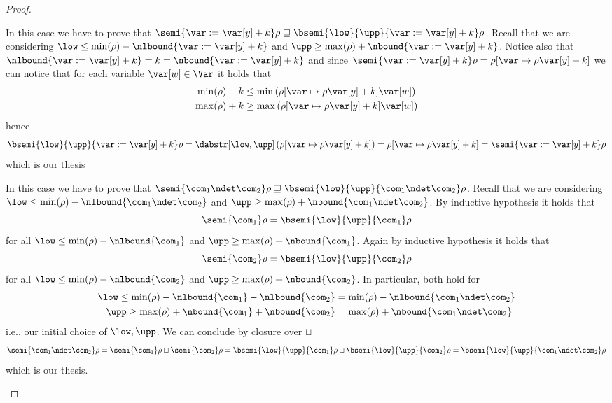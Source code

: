 \begin{proof}
\begin{inductive}
     In this case we have to prove that
    \(\semi{\var := \var[y] + k}\rho \sqsupseteq
    \bsemi{\low}{\upp}{\var:=\var[y]+k}\rho\).  Recall that we
    are considering
    \({\low \leq \min(\rho) - \nlbound{\var:=\var[y]+k}}\) and
    \({\upp \geq \max(\rho) + \nbound{\var:=\var[y]+k}}\). Notice also
    that
    \(\nlbound{\var := \var[y]+k} = k = \nbound{\var := \var[y] + k}\)
    and since
    \(\semi{\var:= \var[y] + k}\rho = \rho[\var \mapsto
    \rho\var[y] + k]\) we can notice that for each variable
    \(\var[w] \in \Var\) it holds that
    \begin{align*}
      \min(\rho) - k & \leq \min\left(\rho[\var \mapsto \rho\var[y] + k] \var[w]\right) \\
      \max(\rho) + k & \geq \max\left(\rho[\var \mapsto \rho\var[y] + k] \var[w]\right)
    \end{align*}
    hence
    \begin{equation*}
      \bsemi{\low}{\upp}{\var := \var[y] + k}\rho = \dabstr[\low,\upp]\left(\rho[\var \mapsto \rho\var[y] + k]\right) = \rho[\var \mapsto \rho\var[y] + k] = \semi{\var := \var[y] + k}\rho
    \end{equation*}
    which is our thesis
    
     In this case we have to prove that
    \(\semi{\com_1 \ndet \com_2}\rho \sqsupseteq
    \bsemi{\low}{\upp}{\com_1 \ndet \com_2}\rho\). Recall that we
    are considering
    \(\low \leq \min(\rho) - \nlbound{\com_1 \ndet \com_2}\) and
    \(\upp \geq \max(\rho) + \nbound{\com_1 \ndet \com_2}\).  By
    inductive hypothesis it holds that
    \begin{equation*}
      \semi{\com_1}\rho = \bsemi{\low}{\upp}{\com_1}\rho
    \end{equation*}
    for all \(\low \leq \min(\rho) - \nlbound{\com_1}\) and
    \(\upp \geq \max(\rho) + \nbound{\com_1}\). Again by inductive
    hypothesis it holds that
    \begin{equation*}
      \semi{\com_2}\rho = \bsemi{\low}{\upp}{\com_2}\rho
    \end{equation*}
    for all \(\low \leq \min(\rho) - \nlbound{\com_2}\) and
    \(\upp \geq \max(\rho) + \nbound{\com_2}\). In particular, both hold
    for
    \begin{align*}
      {\low} \leq {\min(\rho) - \nlbound{\com_1} - \nlbound{\com_2}} & = {\min(\rho) - \nlbound{\com_1 \ndet \com_2}} \\
      {\upp} \geq {\max(\rho) + \nbound{\com_1} + \nbound{\com_2}} & = {\max(\rho) + \nbound{\com_1 \ndet \com_2}}
    \end{align*}
    i.e., our initial choice of \(\low, \upp\). We can conclude by
    closure over \(\sqcup\)
    \begin{equation*}
      \semi{\com_1 \ndet \com_2}\rho = \semi{\com_1}\rho \sqcup \semi{\com_2}\rho = \bsemi{\low}{\upp}{\com_1}\rho \sqcup \bsemi{\low}{\upp}{\com_2}\rho = \bsemi{\low}{\upp}{\com_1\ndet\com_2}\rho
    \end{equation*}
    which is our thesis.


\end{inductive}
\end{proof}
